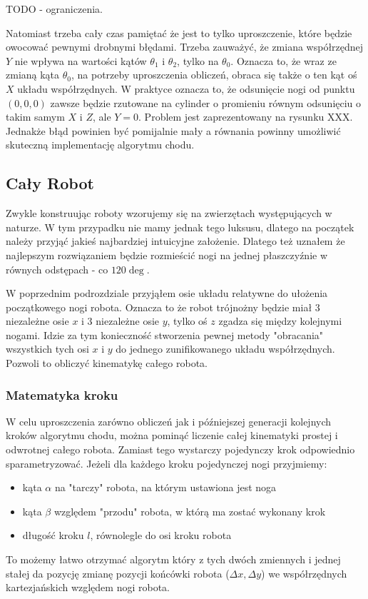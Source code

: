 \documentclass[a4paper,13pt]{article}
\begin{document}
TODO - ograniczenia.

Natomiast trzeba cały czas pamiętać że jest to tylko uproszczenie, które będzie owocować pewnymi drobnymi błędami. Trzeba zauważyć, że zmiana współrzędnej $Y$ nie wpływa na wartości kątów $\theta_1$ i $\theta_2$, tylko na $\theta_0$. Oznacza to, że wraz ze zmianą kąta $\theta_0$, na potrzeby uproszczenia obliczeń, obraca się także o ten kąt oś $X$ układu współrzędnych. W praktyce oznacza to, że odsunięcie nogi od punktu $(0, 0, 0)$ zawsze będzie rzutowane na cylinder o promieniu równym odsunięciu o takim samym $X$ i $Z$, ale $Y = 0$. Problem jest zaprezentowany na rysunku XXX. Jednakże błąd powinien być pomijalnie mały a równania powinny umożliwić skuteczną implementację algorytmu chodu.

\subsection{Cały Robot}
Zwykle konstruując roboty wzorujemy się na zwierzętach występujących w naturze. W tym przypadku nie mamy jednak tego luksusu, dlatego na początek należy przyjąć jakieś najbardziej intuicyjne założenie. Dlatego też uznałem że najlepszym rozwiązaniem będzie rozmieścić nogi na jednej płaszczyźnie w równych odstępach - co $120\deg$.

W poprzednim podrozdziale przyjąłem osie układu relatywne do ułożenia początkowego nogi robota. Oznacza to że robot trójnożny będzie miał 3 niezależne osie $x$ i 3 niezależne osie $y$, tylko oś $z$ zgadza się między kolejnymi nogami. Idzie za tym konieczność stworzenia pewnej metody "obracania" wszystkich tych osi $x$ i $y$ do jednego zunifikowanego układu współrzędnych. Pozwoli to obliczyć kinematykę całego robota.

\subsubsection{Matematyka kroku}
W celu uproszczenia zarówno obliczeń jak i późniejszej generacji kolejnych kroków algorytmu chodu, można pominąć liczenie całej kinematyki prostej i odwrotnej całego robota. Zamiast tego wystarczy pojedynczy krok odpowiednio sparametryzować. Jeżeli dla każdego kroku pojedynczej nogi przyjmiemy:
\begin{itemize}
\item kąta $\alpha$ na "tarczy" robota, na którym ustawiona jest noga
\item kąta $\beta$ względem "przodu" robota, w którą ma zostać wykonany krok
\item długość kroku $l$, równolegle do osi kroku robota
\end{itemize}
To możemy łatwo otrzymać algorytm który z tych dwóch zmiennych i jednej stałej da pozycję zmianę pozycji końcówki robota ($\Delta x, \Delta y$) we współrzędnych kartezjańskich względem nogi robota.
\end{document}
